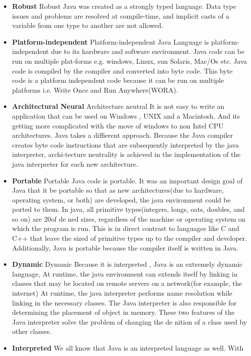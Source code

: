 \begin{itemize}
\item \textbf{Robust}
Robust Java was created as a strongly typed language. Data type issues
and problems are resolved at compile-time, and implicit casts of a variable
from one type to another are not allowed.
\item \textbf{Platform-independent}
Platform-independent Java Language is platform-independent due to its
hardware and software environment. Java code can be run on multiple
plat-forms e.g. windows, Linux, sun Solaris, Mac/Os etc. Java code is
compiled by the compiler and converted into byte code. This byte code is a
platform independent code because it can be run on multiple platforms i.e.
Write Once and Run Anywhere(WORA).
\item \textbf{Architectural Neural}
Architecture neutral It is not easy to write an application that can be used
on Windows , UNIX and a Macintosh. And its getting more complicated
with the move of windows to non Intel CPU architectures.
Java takes a diffierent approach. Because the Java compiler creates byte
code instructions that are subsequently interpreted by the java interpreter,
archi-tecture neutrality is achieved in the implementation of the java
interpreter for each new architecture.
\item \textbf{Portable}
Portable Java code is portable. It was an important design goal of Java that it
be portable so that as new architectures(due to hardware, operating system,
or both) are developed, the java environment could be ported to them.
In java, all primitive types(integers, longs, oats, doubles, and so on) are
20of de ned sizes, regardless of the machine or operating system on which
the program is run. This is in direct contrast to languages like C and C++
that leave the sized of primitive types up to the compiler and developer.
Additionally, Java is portable because the compiler itself is written in Java.
\item \textbf{Dynamic}
Dynamic Because it is interpreted , Java is an extremely dynamic language, At
runtime, the java environment can extends itself by linking in classes that may
be located on remote servers on a network(for example, the internet)
At runtime, the java interpreter performs name resolution while linking in the
necessary classes. The Java interpreter is also responsible for determining
the placement of object in memory. These two features of the Java interpreter
solve the problem of changing the de nition of a class used by other classes.
\item \textbf{Interpreted}
We all know that Java is an interpreted language as well. With

\end{itemize}
